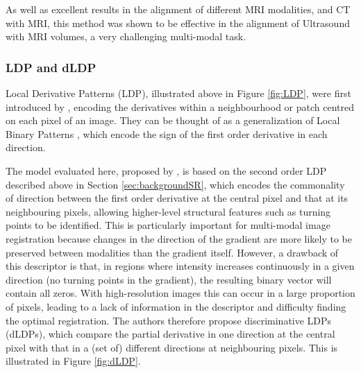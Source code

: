 \documentclass{report}
\begin{document}
As well as excellent results in the alignment of different MRI modalities, and CT with MRI, this method was shown to be effective in the alignment of Ultrasound with MRI volumes, a very challenging multi-modal task.

\subsubsection{LDP and dLDP}
Local Derivative Patterns (LDP), illustrated above in Figure \ref{fig:LDP}, were first introduced by \cite{zhang2009local}, encoding the derivatives within a neighbourhood or patch centred on each pixel of an image. They can be thought of as a generalization of Local Binary Patterns \citep{ojala2002multiresolution}, which encode the sign of the first order derivative in each direction. 

The model evaluated here, proposed by \cite{jiang2017fast}, is based on the second order LDP described above in Section \ref{sec:backgroundSR}, which encodes the commonality of direction between the first order derivative at the central pixel and that at its neighbouring pixels, allowing higher-level structural features such as turning points to be identified. This is particularly important for multi-modal image registration because changes in the direction of the gradient are more likely to be preserved between modalities than the gradient itself. However, a drawback of this descriptor is that, in regions where intensity increases continuously in a given direction (no turning points in the gradient), the resulting binary vector will contain all zeros. With high-resolution images this can occur in a large proportion of pixels, leading to a lack of information in the descriptor and difficulty finding the optimal registration. The authors therefore propose discriminative LDPs (dLDPs), which compare the partial derivative in one direction at the central pixel with that in a (set of) different directions at neighbouring pixels. This is illustrated in Figure \ref{fig:dLDP}.
\end{document}
